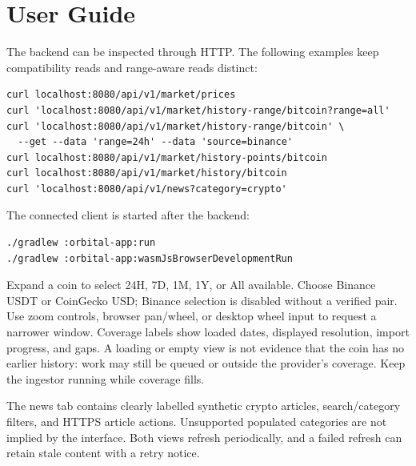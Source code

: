 \documentclass{scrartcl}
\begin{document}
\par\medskip\noindent\begin{minipage}{\linewidth}
\section{User Guide}\label{user-guide}

The backend can be inspected through HTTP. The following examples keep compatibility reads and
range-aware reads distinct:

\par\medskip\noindent\begin{minipage}{\linewidth}
\begin{verbatim}
curl localhost:8080/api/v1/market/prices
curl 'localhost:8080/api/v1/market/history-range/bitcoin?range=all'
curl 'localhost:8080/api/v1/market/history-range/bitcoin' \
  --get --data 'range=24h' --data 'source=binance'
curl localhost:8080/api/v1/market/history-points/bitcoin
curl localhost:8080/api/v1/market/history/bitcoin
curl 'localhost:8080/api/v1/news?category=crypto'
\end{verbatim}
\end{minipage}\par\medskip
\end{minipage}\par\medskip

The connected client is started after the backend:
\par\medskip\noindent\begin{minipage}{\linewidth}
\begin{verbatim}
./gradlew :orbital-app:run
./gradlew :orbital-app:wasmJsBrowserDevelopmentRun
\end{verbatim}
\end{minipage}\par\medskip

Expand a coin to select 24H, 7D, 1M, 1Y, or All available. Choose Binance USDT or CoinGecko USD;
Binance selection is disabled without a verified pair. Use zoom controls, browser pan/wheel, or
desktop wheel input to request a narrower window. Coverage labels show loaded dates, displayed
resolution, import progress, and gaps. A loading or empty view is not evidence that the coin has
no earlier history: work may still be queued or outside the provider's coverage. Keep the ingestor
running while coverage fills.

The news tab contains clearly labelled synthetic crypto articles, search/category filters, and
HTTPS article actions. Unsupported populated categories are not implied by the interface. Both
views refresh periodically, and a failed refresh can retain stale content with a retry notice.
\end{document}
